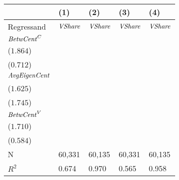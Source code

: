 \begin{tabular}{lllll}
\toprule
{} &                                    (1) &                                    (2) &                                    (3) &                                    (4) \\
\midrule
Regressand           &                         ${\it VShare}$ &                         ${\it VShare}$ &                         ${\it VShare}$ &                         ${\it VShare}$ \\
${\it BetwCent}^C$   &  \makecell{$0.672^{***}$ \\ ($1.864$)} &  \makecell{$0.257^{***}$ \\ ($0.712$)} &                            \makecell{} &                            \makecell{} \\
${\it AvgEigenCent}$ &                            \makecell{} &  \makecell{$0.397^{***}$ \\ ($1.625$)} &                            \makecell{} &  \makecell{$0.426^{***}$ \\ ($1.745$)} \\
${\it BetwCent}^V$   &                            \makecell{} &                            \makecell{} &  \makecell{$0.756^{***}$ \\ ($1.710$)} &  \makecell{$0.258^{***}$ \\ ($0.584$)} \\
\midrule N           &                                 60,331 &                                 60,135 &                                 60,331 &                                 60,135 \\
$R^2$                &                                  0.674 &                                  0.970 &                                  0.565 &                                  0.958 \\
\bottomrule
\end{tabular}
